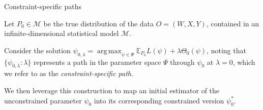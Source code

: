 \documentclass[12pt,t]{beamer}
\newcommand{\E}{\mathbb{E}}
\DeclareMathOperator*{\argmax}{arg\,max}
\begin{document}

\begin{frame}[c]{Constraint-specific paths}

\begin{center}

Let $P_0 \in \mathcal{M}$ be the true distribution of the data $O = (W, X, Y)$,
contained in an infinite-dimensional statistical model $\mathcal{M}$.

\vspace{1em}

Consider the solution $\psi_{0, \lambda} = \argmax_{\psi \in \Psi}
\E_{P_0}L(\psi) + \lambda \Theta_0(\psi)$, noting that $\{\psi_{0, \lambda} :
\lambda\}$ represents a path in the parameter space $\Psi$ through $\psi_0$ at
$\lambda = 0$, which we refer to as the \textit{constraint-specific path}.

\vspace{1em}

We then leverage this construction to map an initial estimator of the
unconstrained parameter $\psi_0$ into its corresponding constrained version
$\psi_0^*$.

\end{center}

\note{
}

\end{frame}

\end{document}
